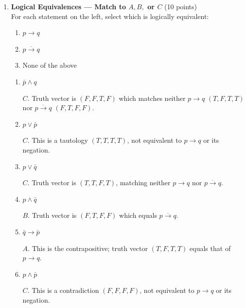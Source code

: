 \begin{enumerate}
  \item \textbf{Logical Equivalences --- Match to $A,B,$ or $C$} (10 points)\\
  For each statement on the left, select which is logically equivalent: 
  \begin{enumerate}[label=(\Alph*)]
    \item $p \rightarrow q$
    \item $\overline{p \rightarrow q}$
    \item None of the above
  \end{enumerate}
  \begin{enumerate}[label=\arabic*.]
    \item $\bar{p} \wedge q$\\
    \begin{subanswer}
      $C$. Truth vector is $(F,F,T,F)$ which matches neither $p\rightarrow q$ $(T,F,T,T)$ nor $\overline{p\rightarrow q}$ $(F,T,F,F)$.
    \end{subanswer}

    \item $p \vee \bar{p}$\\
    \begin{subanswer}
      $C$. This is a tautology $(T,T,T,T)$, not equivalent to $p\rightarrow q$ or its negation.
    \end{subanswer}

    \item $p \vee \bar{q}$\\
    \begin{subanswer}
      $C$. Truth vector is $(T,T,F,T)$, matching neither $p\rightarrow q$ nor $\overline{p\rightarrow q}$.
    \end{subanswer}

    \item $p \wedge \bar{q}$\\
    \begin{subanswer}
      $B$. Truth vector is $(F,T,F,F)$ which equals $\overline{p\rightarrow q}$.
    \end{subanswer}

    \item $\bar{q} \rightarrow \bar{p}$\\
    \begin{subanswer}
      $A$. This is the contrapositive; truth vector $(T,F,T,T)$ equals that of $p\rightarrow q$.
    \end{subanswer}

    \item $p \wedge \bar{p}$\\
    \begin{subanswer}
      $C$. This is a contradiction $(F,F,F,F)$, not equivalent to $p\rightarrow q$ or its negation.
    \end{subanswer}


\end{enumerate}
\end{enumerate}
